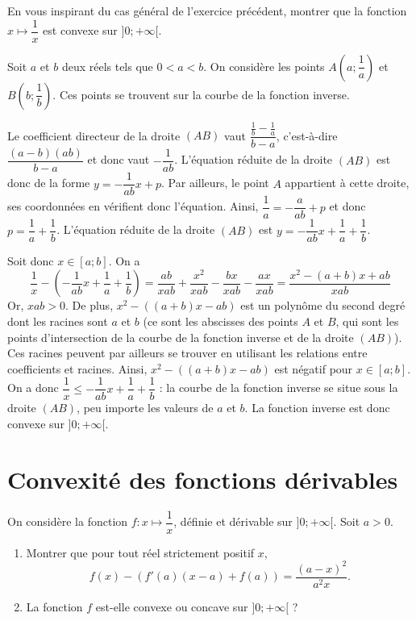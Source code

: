 \documentclass[11pt,fleqn, openany]{book} %
\begin{document}
\begin{exercise}En vous inspirant du cas général de l'exercice précédent, montrer que la fonction $x\mapsto \dfrac{1}{x}$ est convexe sur $]0;+\infty[$.\end{exercise}

\begin{solution}Soit $a$ et $b$ deux réels tels que $0<a<b$. On considère les points $A\left(a;\dfrac{1}{a}\right)$ et $B\left(b;\dfrac{1}{b}\right)$. Ces points se trouvent sur la courbe de la fonction inverse.

Le coefficient directeur de la droite \((AB)\) vaut \(\dfrac{\frac{1}{b}-\frac{1}{a}}{b-a}\), c'est-à-dire \(\dfrac{(a-b)(ab)}{b-a}\) et donc vaut \(-\dfrac{1}{ab}\). L'équation réduite de la droite \((AB)\) est donc de la forme \(y=-\dfrac{1}{ab}x+p\). Par ailleurs, le point \(A\) appartient à cette droite, ses coordonnées en vérifient donc l'équation. Ainsi, \(\dfrac{1}{a}=-\dfrac{a}{ab}+p\) et donc \(p=\dfrac{1}{a}+\dfrac{1}{b}\). L'équation réduite de la droite \((AB)\) est \(y=-\dfrac{1}{ab}x+\dfrac{1}{a}+\dfrac{1}{b}\).

Soit donc $x\in [a;b]$. On a
\[\dfrac{1}{x}-\left(-\dfrac{1}{ab}x+\dfrac{1}{a}+\dfrac{1}{b}\right)=\dfrac{ab}{xab}+\dfrac{x^2}{xab}-\dfrac{bx}{xab}-\dfrac{ax}{xab}=\dfrac{x^2-(a+b)x+ab}{xab}\]
Or, $xab>0$. De plus, \(x^2-((a+b)x-ab)\) est un polynôme du second degré dont les racines sont \(a\) et \(b\) (ce sont les abscisses des points \(A\) et \(B\), qui sont les points d'intersection de la courbe de la fonction inverse et de la droite \((AB)\)). Ces racines peuvent par ailleurs se trouver en utilisant les relations entre coefficients et racines. Ainsi, \(x^2-((a+b)x-ab)\) est négatif pour \(x \in [a;b]\). On a donc \(\dfrac{1}{x} \leqslant -\dfrac{1}{ab}x+\dfrac{1}{a}+\dfrac{1}{b}\) : la courbe de la fonction inverse se situe sous la droite $(AB)$, peu importe les valeurs de $a$ et $b$. La fonction inverse est donc convexe sur $]0;+\infty[$.
\end{solution}




\section*{Convexité des fonctions dérivables}

\begin{exercise}On considère la fonction $f:x\mapsto \dfrac{1}{x}$, définie et dérivable sur $]0;+\infty[$. Soit $a>0$.
\begin{enumerate}
\item Montrer que pour tout réel strictement positif $x$, 
\[f(x)-(f'(a)(x-a)+f(a))=\dfrac{(a-x)^2}{a^2x}.\]
\item La fonction $f$ est-elle convexe ou concave sur $]0;+\infty[$ ?
\end{enumerate}\end{exercise}
\end{document}
